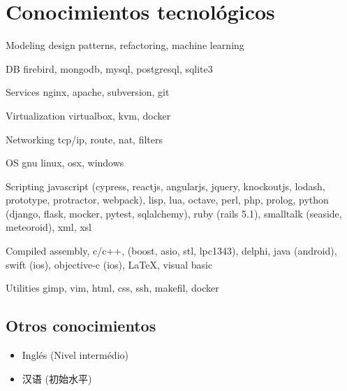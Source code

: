 \documentclass[a4paper]{article}
\begin{document}
\section{Conocimientos tecnol{\'o}gicos}
\begin{CV}
\item[Modeling] design patterns, refactoring, machine learning
\item[DB] firebird, mongodb, mysql, postgresql, sqlite3
\item[Services] nginx, apache, subversion, git
\item[Virtualization] virtualbox, kvm, docker
\item[Networking] tcp/ip, route, nat, filters
\item[OS] gnu linux, osx, windows
\item[Scripting] javascript (cypress, reactjs, angularjs, jquery, knockoutjs, lodash, prototype, protractor, webpack), lisp, lua, octave, perl, php, prolog, python (django, flask, mocker, pytest, sqlalchemy), ruby (rails 5.1), smalltalk (seaside, meteoroid), xml, xsl
\item[Compiled] assembly, c/c++, (boost, asio, stl, lpc1343), delphi, java (android), swift (ios), objective-c (ios), \LaTeX, visual basic
\item[Utilities] gimp, vim, html, css, ssh, makefil, docker
\end{CV}

\begin{CJK}{UTF8}{gbsn}
\section{Otros conocimientos}
\begin{itemize}
\item Ingl{\'e}s (Nivel interm{\'e}dio)
\item 汉语 (初始水平)
\end{itemize}
\end{CJK}
\end{document}
